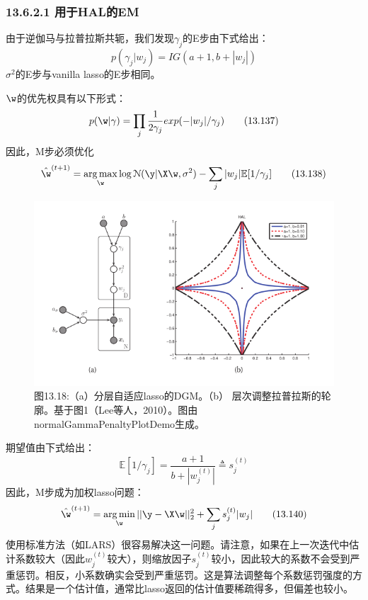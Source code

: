 \documentclass[a4paper]{article}
\DeclareMathOperator*{\argmin}{arg\,min}
\DeclareMathOperator*{\argmax}{arg\,max}
\begin{document}
\subsubsection*{13.6.2.1 用于HAL的EM}
由于逆伽马与拉普拉斯共轭，我们发现$\gamma_j$的E步由下式给出：
\begin{equation}
	p(\gamma_j|w_j)=IG(a+1,b+|w_j|)\tag{13.136}
\end{equation}
$\sigma^2$的E步与vanilla lasso的E步相同。

$\w$的优先权具有以下形式：
\begin{equation}
	p(\w|\gamma)=\prod_j\frac{1}{2\gamma_j}exp(-|w_j|/\gamma_j)\tag{13.137}
\end{equation}
因此，M步必须优化
\begin{equation}
	\hat{\w}^{(t+1)}=\argmax_\w \log \mathcal{N}(\y|\X\w,\sigma^2)-\sum_{j}|w_j|\mathbb{E}[1/\gamma_j]\tag{13.138}
\end{equation}

\begin{figure}[h]
	\centering
	\includegraphics[width=0.7\linewidth]{fig13/figure18}
	\caption*{图13.18:（a）分层自适应lasso的DGM。（b） 层次调整拉普拉斯的轮廓。基于图1（Lee等人，2010）。图由normalGammaPenaltyPlotDemo生成。}
\end{figure}
期望值由下式给出：
\begin{equation}
	\mathbb{E}[1/\gamma_j]=\dfrac{a+1}{b+|w_j^{(t)}|}\triangleq s_j^{(t)}\tag{13.139}
\end{equation}
因此，M步成为加权lasso问题：
\begin{equation}
	\hat{\w}^{(t+1)}=\argmin_\w||\y-\X\w||_2^2+\sum_{j}s_j^{(t)}|w_j|\tag{13.140}
\end{equation}
使用标准方法（如LARS）很容易解决这一问题。请注意，如果在上一次迭代中估计系数较大（因此$w_j^{(t)}$较大），则缩放因子$s_j^{(t)}$较小，因此较大的系数不会受到严重惩罚。相反，小系数确实会受到严重惩罚。这是算法调整每个系数惩罚强度的方式。结果是一个估计值，通常比lasso返回的估计值要稀疏得多，但偏差也较小。
\end{document}
